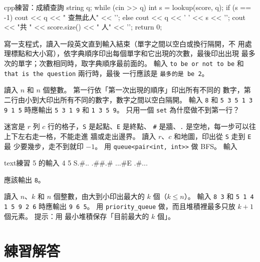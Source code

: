 \begin{drills}[label=drills:ch8]
\begin{code}{cpp}{練習：成績查詢}
{    string q;
    while (cin >> q) {
        int s = lookup(score, q);
        if (s == -1) {
            cout << q << " 查無此人" << '\n';
        } else {
            cout << q << ' ' << s << '\n';
        }
    }
    cout << "共 " << score.size() << " 人" << '\n';
    return 0;
}
\end{code}
\item 寫一支程式，讀入一段英文直到輸入結束（單字之間以空白或換行隔開，不
用處理標點和大小寫），依字典順序印出每個單字和它出現的次數，最後印出出現
最多次的單字；次數相同時，取字典順序最前面的。 輸入
\texttt{to be or not to be} 和 \texttt{that is the question} 兩行時，最後
一行應該是 \texttt{最多的是 be 2}。
\item 讀入 $n$ 和 $n$ 個整數。 第一行依「第一次出現的順序」印出所有不同的
數字，第二行由小到大印出所有不同的數字，數字之間以空白隔開。 輸入
\texttt{8} 和 \texttt{5 3 5 1 3 9 1 5} 時應輸出 \texttt{5 3 1 9} 和
\texttt{1 3 5 9}。 只用一個 \texttt{set} 為什麼做不到第一行？
\item 迷宮是 $r$ 列 $c$ 行的格子，\texttt{S} 是起點、\texttt{E} 是終點、
\texttt{\#} 是牆、\texttt{.} 是空地，每一步可以往上下左右走一格，不能走進
牆或走出邊界。 讀入 $r$、$c$ 和地圖，印出從 \texttt{S} 走到 \texttt{E} 最
少要幾步，走不到就印 $-1$。 用 \texttt{queue<pair<int, int>>} 做 BFS。 輸入
\begin{code}{text}{練習 5 的輸入}
4 5
S.#..
.##.#
...#E
.#...
\end{code}
應該輸出 \texttt{8}。
\item 讀入 $n$、$k$ 和 $n$ 個整數，由大到小印出最大的 $k$ 個（$k \le n$）。
輸入 \texttt{8 3} 和 \texttt{5 1 4 1 5 9 2 6} 時應輸出 \texttt{9 6 5}。 用
\texttt{priority\_queue} 做，而且堆積裡最多只放 $k + 1$ 個元素。 提示：用
最小堆積保存「目前最大的 $k$ 個」。
\end{drills}

\section*{練習解答}

